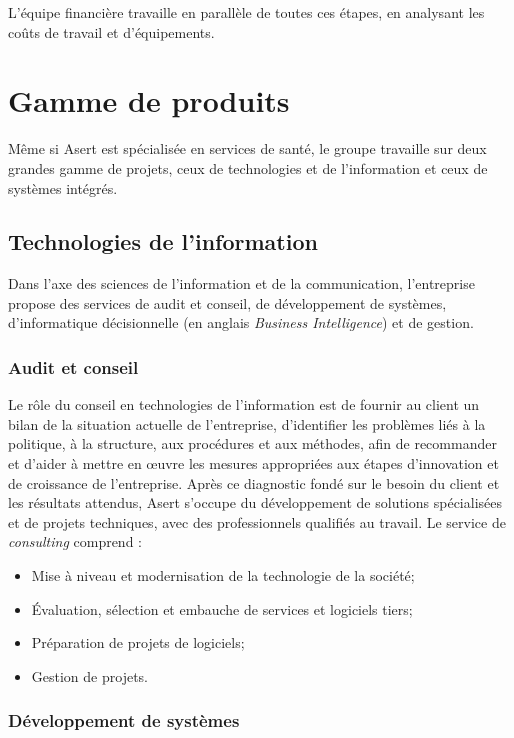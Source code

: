L'équipe financière travaille en parallèle de toutes ces étapes, en analysant les coûts de travail et d'équipements.

\section{Gamme de produits}

Même si Asert est spécialisée en services de santé, le groupe travaille  sur deux grandes gamme de projets, ceux de technologies et de l'information et ceux de systèmes intégrés. 

\subsection{Technologies de l'information}

Dans l'axe des sciences de l'information et de la communication, l'entreprise propose des services de audit et conseil, de développement de systèmes, d'informatique décisionnelle (en anglais \textit{Business Intelligence}) et de gestion.

\subsubsection{Audit et conseil}

Le rôle du conseil en technologies de l'information est de fournir au client un bilan de la situation actuelle de l'entreprise, d'identifier les problèmes liés à la politique, à la structure, aux procédures et aux méthodes, afin de recommander et d'aider à mettre en \oe{}uvre les mesures appropriées aux étapes d'innovation et de croissance de l'entreprise. Après ce diagnostic fondé sur le besoin du client et les résultats attendus, Asert s'occupe du développement de solutions spécialisées et de projets techniques, avec des professionnels qualifiés au travail. Le service de \textit{consulting} comprend :

\begin{itemize}
\item Mise à niveau et modernisation de la technologie de la société;
\item Évaluation, sélection et embauche de services et logiciels tiers;
\item Préparation de projets de logiciels;
\item Gestion de projets.
\end{itemize}

\subsubsection{Développement de systèmes}

